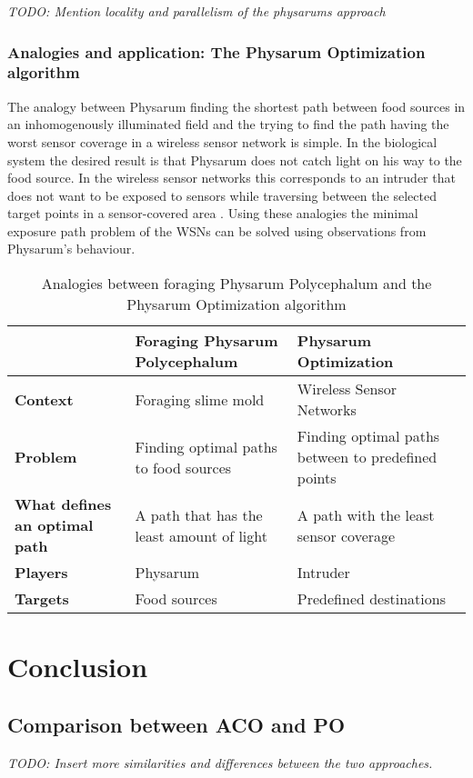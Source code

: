 \documentclass{IWORK2014}
\begin{document}
\textit{TODO: Mention locality and parallelism of the physarums approach}
\subsubsection{Analogies and application: The Physarum Optimization algorithm}
The analogy between Physarum finding the shortest path between food sources in an inhomogenously illuminated field and the trying to find the path having the worst sensor coverage in a wireless sensor network is simple. In the biological system the desired result is that Physarum does not catch light on his way to the food source. In the wireless sensor networks this corresponds to an intruder that does not want to be exposed to sensors while traversing between the selected target points in a sensor-covered area \cite{liu2012physarum}. Using these analogies the minimal exposure path problem of the WSNs can be solved using observations from Physarum's behaviour.

\begin{table}
	\begin{tabularx}{\textwidth}{|X|X|X|}
		\hline & \textbf{Foraging Physarum Polycephalum} & \textbf{Physarum Optimization} \\ \hline
		\textbf{Context} & Foraging slime mold & Wireless Sensor Networks \\ \hline
		\textbf{Problem} & Finding optimal paths to food sources & Finding optimal paths between to predefined points \\ \hline
		\textbf{What defines an optimal path} & A path that has the least amount of light & A path with the least sensor coverage \\ \hline
		\textbf{Players} & Physarum & Intruder \\ \hline
		\textbf{Targets} & Food sources & Predefined destinations \\ \hline
	\end{tabularx}
	\caption{Analogies between foraging Physarum Polycephalum and the Physarum Optimization algorithm}
	\label{tbl:analogies_physarum}
\end{table}

\section{Conclusion}

\subsection{Comparison between ACO and PO}
\textit{TODO: Insert more similarities and differences between the two approaches.}
\end{document}
